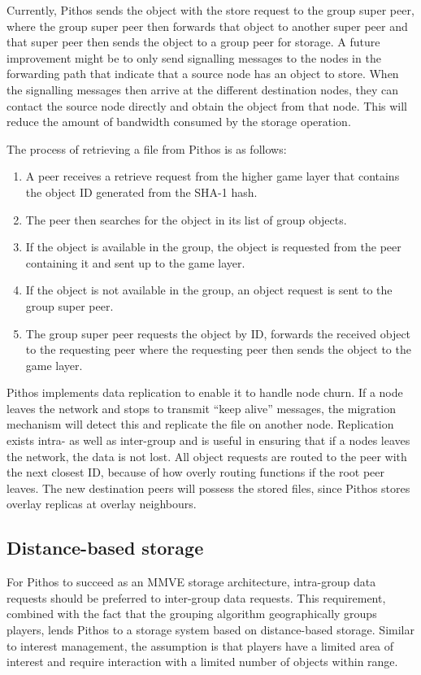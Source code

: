 \documentclass[10pt,a4paper,conference]{IEEEtran}
\begin{document}
Currently, Pithos sends the object with the store request to the group super peer, where the group super peer then forwards that object to another
super peer and that super peer then sends the object to a group peer for storage. A future improvement might be to only send signalling messages to
the nodes in the forwarding path that indicate that a source node has an object to store. When the signalling messages then arrive at the different
destination nodes, they can contact the source node directly and obtain the object from that node. This will reduce the amount of bandwidth consumed
by the storage operation.

The process of retrieving a file from Pithos is as follows:
\begin{enumerate}
\item A peer receives a retrieve request from the higher game layer that contains the object ID generated from the SHA-1 hash.
\item The peer then searches for the object in its list of group objects.
\item If the object is available in the group, the object is requested from the peer containing it and sent up to the game layer.
\item If the object is not available in the group, an object request is sent to the group super peer.
\item The group super peer requests the object by ID, forwards the received object to the requesting peer where the requesting peer then sends
    the object to the game layer.
\end{enumerate}

Pithos implements data replication to enable it to handle node churn. If a node leaves the network and stops to transmit ``keep alive'' messages, the
migration mechanism will detect this and replicate the file on another node. Replication exists intra- as well as inter-group and is useful in
ensuring that if a nodes leaves the network, the data is not lost. All object requests are routed to the peer with the next closest ID, because of
how overly routing functions if the root peer leaves. The new destination peers will possess the stored files, since Pithos stores overlay replicas
at overlay neighbours.

\subsection{Distance-based storage}
\label{distance_based}

For Pithos to succeed as an MMVE storage architecture, intra-group data requests should be preferred to inter-group data requests. This requirement,
combined with the fact that the grouping algorithm geographically groups players, lends Pithos to a storage system based on distance-based storage.
Similar to interest management, the assumption is that players have a limited area of interest and require interaction with a limited number of
objects within range.
\end{document}
